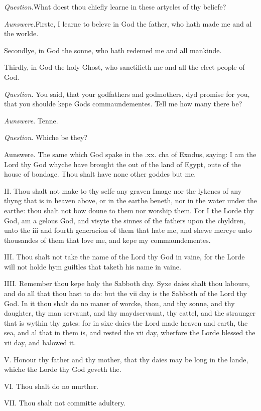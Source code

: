 \emph{Question.}What doest thou chiefly learne in
these artycles of thy beliefe?

\emph{Aunswere.}Firste, I learne to beleve in God
the father, who hath made me and al the worlde.

Secondlye, in God the sonne, who hath redemed me and
all mankinde.

Thirdly, in God the holy Ghost, who sanctifieth me
and all the elect people of God. 

\emph{Question}. You said, that your godfathers and
godmothers, dyd promise for you, that you shoulde kepe Gods commaundementes.
Tell me how many there be?

\emph{Aunswere}. Tenne.

\emph{Question}. Whiche be they?

Aunswere. The same which God spake in the .xx. cha
of Exodus, saying: I am the Lord thy God whyche have brought the out of
the land of Egypt, oute of the house of bondage. Thou shalt have none
other goddes but me.

II. Thou shalt not make to thy selfe any graven Image
nor the lykenes of any thyng that is in heaven above, or in the earthe
beneth, nor in the water under the earthe: thou shalt not bow doune to
them nor worship them. For I the Lorde thy God, am a gelous God, and visyte
the sinnes of the fathers upon the chyldren, unto the iii and fourth generacion
of them that hate me, and shewe mercye unto thousandes of them that love
me, and kepe my commaundementes.

III. Thou shalt not take the name of the Lord thy God
in vaine, for the Lorde will not holde hym guiltles that taketh his name
in vaine.

IIII. Remember thou kepe holy the Sabboth day. Syxe
daies shalt thou laboure, and do all that thou hast to do: but the vii
day is the Sabboth of the Lord thy God. In it thou shalt do no maner of
worcke, thou, and thy sonne, and thy daughter, thy man servaunt, and thy
maydservaunt, thy cattel, and the straunger that is wythin thy gates:
for in sixe daies the Lord made heaven and earth, the sea, and al that
in them is, and rested the vii day, wherfore the Lorde blessed the vii
day, and halowed it.

V. Honour thy father and thy mother, that thy daies
may be long in the lande, whiche the Lorde thy God geveth the.

VI. Thou shalt do no murther.

VII. Thou shalt not committe adultery.

